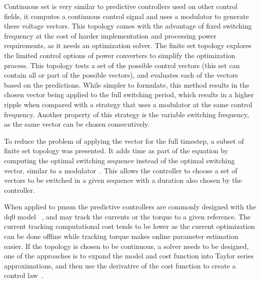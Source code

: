 Continuous set is very similar to predictive controllers used on other control fields, it computes a continuous control signal and uses a modulator to generate these voltage vectors. This topology comes with the advantage of fixed switching frequency at the cost of harder implementation and processing power requirements, as it needs an optimization solver. The finite set topology explores the limited control options of power converters to simplify the optimization process. This topology tests a set of the possible control vectors (this set can contain all or part of the possible vectors), and evaluates each of the vectors based on the predictions. While simpler to formulate, this method results in the chosen vector being applied to the full switching period, which results in a higher ripple when compared with a strategy that uses a modulator at the same control frequency. Another property of this strategy is the variable switching frequency, as the same vector can be chosen consecutively. 

To reduce the problem of applying the vector for the full timestep, a subset of finite set topology was presented. It adds time as part of the equation by computing the optimal switching sequence instead of the optimal switching vector, similar to a modulator~\cite{Vazquez:MPC_in_power_systems_review:2017:IEEE}. This allows the controller to choose a set of vectors to be switched in a given sequence with a duration also chosen by the controller.

When applied to \gls{pmsm} the predictive controllers are commonly designed with the dq0 model ~\cite{Sun:MPC_deadbeat_PMSM:2021}, and may track the currents or the torque to a given reference. The current tracking computational cost tends to be lower as the current optimization can be done offline while tracking torque makes online parameter estimation easier. If the topology is chosen to be continuous, a solver needs to be designed, one of the approaches is to expand the model and cost function into Taylor series approximations, and then use the derivative of the cost function to create a control law~\cite{Errouissi:MPC_taylor_series:2012}. 
